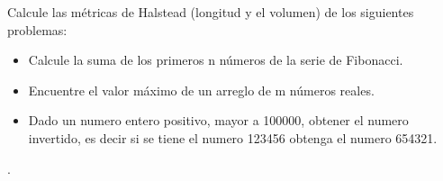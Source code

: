 Calcule las métricas de Halstead (longitud y el volumen) de los siguientes problemas:

\begin{itemize}
\item Calcule la suma de los primeros n números de la serie de Fibonacci.
\item Encuentre el valor máximo de un arreglo de m números reales.
\item Dado un numero entero positivo, mayor a 100000, obtener el numero invertido, es decir si se tiene el numero 123456 obtenga el numero 654321.
\end{itemize}

.
